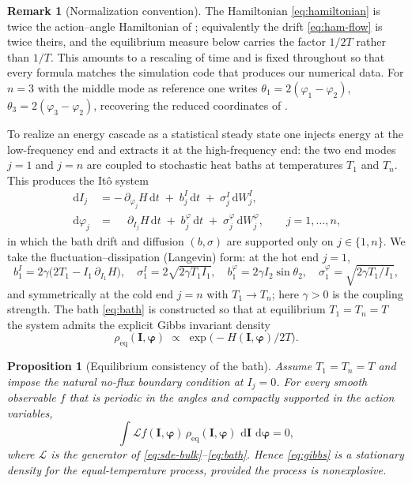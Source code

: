 \documentclass[11pt,a4paper]{article}
\newtheorem{proposition}[theorem]{Proposition}
\theoremstyle{definition}
\newtheorem{remark}[theorem]{Remark}
\newcommand{\dd}{\,\mathrm{d}}
\numberwithin{equation}{section}   %
\newcommand{\bI}{\mathbf{I}}
\newcommand{\bphi}{\boldsymbol{\varphi}}
\newcommand{\Lgen}{\mathcal{L}}
\begin{document}
\begin{remark}[Normalization convention]\label{rem:convention}
The Hamiltonian \eqref{eq:hamiltonian} is twice the action--angle Hamiltonian of
\cite{HLNS}; equivalently the drift \eqref{eq:ham-flow} is twice theirs, and the
equilibrium measure below carries the factor $1/2T$ rather than $1/T$. This
amounts to a rescaling of time and is fixed throughout so that every formula
matches the simulation code that produces our numerical data. For $n=3$ with the
middle mode as reference one writes $\theta_1=2(\varphi_1-\varphi_2)$,
$\theta_3=2(\varphi_3-\varphi_2)$, recovering the reduced coordinates of
\cite{HLNS}.
\end{remark}

To realize an energy cascade as a statistical steady state one injects energy at
the low-frequency end and extracts it at the high-frequency end: the two end
modes $j=1$ and $j=n$ are coupled to stochastic heat baths at temperatures $T_1$
and $T_n$. This produces the It\^o system
\begin{align}\label{eq:sde-bulk}
  \dd I_j   &= -\,\partial_{\varphi_j} H \dd t
             \;+\; b^{I}_j \dd t \;+\; \sigma^{I}_j \dd W^{I}_j, \\
  \dd \varphi_j &= \phantom{-}\partial_{I_j} H \dd t
             \;+\; b^{\varphi}_j \dd t \;+\; \sigma^{\varphi}_j \dd W^{\varphi}_j,
             \qquad j = 1,\dots,n, \nonumber
\end{align}
in which the bath drift and diffusion $(b,\sigma)$ are supported only on
$j\in\{1,n\}$. We take the fluctuation--dissipation (Langevin) form: at the hot
end $j=1$,
\begin{equation}\label{eq:bath}
  b^{I}_1 = 2\gamma\big(2T_1 - I_1\,\partial_{I_1}H\big),\quad
  \sigma^{I}_1 = 2\sqrt{2\gamma T_1 I_1},\quad
  b^{\varphi}_1 = 2\gamma I_2 \sin\theta_2,\quad
  \sigma^{\varphi}_1 = \sqrt{2\gamma T_1/I_1},
\end{equation}
and symmetrically at the cold end $j=n$ with $T_1\to T_n$; here $\gamma>0$ is the
coupling strength. The bath \eqref{eq:bath} is constructed so that at equilibrium
$T_1=T_n=T$ the system admits the explicit Gibbs invariant density
\begin{equation}\label{eq:gibbs}
  \rho_{\mathrm{eq}}(\bI,\bphi) \;\propto\; \exp\!\big(-H(\bI,\bphi)/2T\big).
\end{equation}

\begin{proposition}[Equilibrium consistency of the bath]\label{prop:gibbs-bath}
Assume $T_1=T_n=T$ and impose the natural no-flux boundary condition at
$I_j=0$. For every smooth observable $f$ that is periodic in the angles and
compactly supported in the action variables,
\[
  \int \Lgen f(\bI,\bphi)\,\rho_{\mathrm{eq}}(\bI,\bphi)\,\dd\bI\,\dd\bphi=0,
\]
where $\Lgen$ is the generator of \eqref{eq:sde-bulk}--\eqref{eq:bath}. Hence
\eqref{eq:gibbs} is a stationary density for the equal-temperature process,
provided the process is nonexplosive.
\end{proposition}
\end{document}
